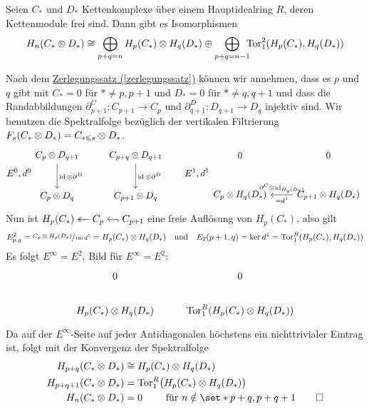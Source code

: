 \begin{satz}[label=satz:hom_tensor]
	Seien $C_*$ und $D_*$ Kettenkomplexe über einem Hauptidealring $R$, deren Kettenmodule frei sind.
	Dann gibt es Isomorphismen
	\[
		H_n \enbrace*{C_* \otimes D_*} \cong \smashoperator[r]{\bigoplus_{p+q=n}}\enspace H_p(C_*) \otimes H_q(D_*) \oplus \smashoperator[r]{\bigoplus_{p+q=n-1}}\enspace \Tor_1^2 \enbrace*{H_p(C_*),H_q(D_*)}
	\]
\end{satz}
\begin{beweis}
	Nach dem \hyperref[zerlegungssatz]{Zerlegungssatz (\ref*{zerlegungssatz})} können wir annehmen, dass es $p$ und $q$ gibt mit $C_*=0$ für $*\neq p,p+1$ und $D_*=0$ für $* \neq q,q+1$ und dass die Randabbildungen $\partial^C_{p+1} \colon C_{p+1} \to C_p$ und $\partial^D_{q+1} \colon D_{q+1} \to D_q$ injektiv sind.
	Wir benutzen die Spektralfolge bezüglich der vertikalen Filtrierung $F_s \enbrace*{C_* \otimes D_*} = C_{*\le s} \otimes D_*$.
	\[
		E^0,d^0
		\begin{tikzcd}[row sep=large]
			C_{p} \otimes D_{q+1} \dar["\id \otimes \partial^D"] & C_{p+q} \otimes D_{q+1} \dar["\id \otimes \partial^D"] \\
			C_p \otimes D_q & C_{p+1} \otimes D_q
		\end{tikzcd}
		\qquad 
		E^1,d^1
		\begin{tikzcd}[row sep=large]
			0 & 0 \\
			C_p \otimes H_q(D_*) & C_{p+1} \otimes H_q(D_*) \lar["\partial^C \otimes \id_{H_q(D_*)}"',"=d^1"]
		\end{tikzcd}
	\]
	Nun ist $\begin{tikzcd}[cramped,sep=small] H_p(C_*) & C_p \lar[two heads] & C_{p+1} \lar[hook] \end{tikzcd}$ eine freie Auflösung von $H_p(C_*)$, also gilt
	\[
		E^2_{p,q} = \sfrac{C_p \otimes H_p(D_*)}{\im d^1} = H_p \enbrace*{C_*} \otimes H_q(D_*) \quad \text{und} \quad 
		E_2(p+1,q) = \ker d^1 = \Tor_1^R \enbrace*{H_p(C_*), H_q(D_*)}
	\]
	Es folgt $E^\infty=E^2$.
	Bild für $E^\infty=E^2$:
	\[
		\begin{tikzcd}
			0 & 0 \\
			H_p(C_*) \otimes H_q(D_*) & \Tor_1^R \enbrace*{H_p(C_*) \otimes H_q(D_*)}
		\end{tikzcd}
	\]
	Da auf der $E^\infty$-Seite auf jeder Antidiagonalen höchstens ein nichttrivialer Eintrag ist, folgt mit der Konvergenz der Spektralfolge 
	\begin{align}
		H_{p+q}(C_* \otimes D_*) &\cong H_p(C_*) \otimes H_q(D_*) \\
		H_{p+q+1}(C_* \otimes D_*) &= \Tor_1^R \enbrace[\big]{H_p(C_*) \otimes H_q(D_*)} \\
		H_n(C_* \otimes D_*)&= 0 \qquad \text{ für } n \notin \set*{p+q,p+q+1} \qedhere
	\end{align}
\end{beweis}

